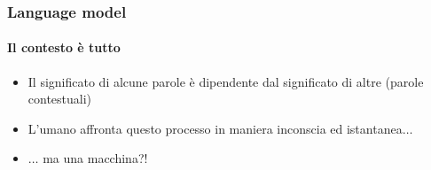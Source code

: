 \begin{frame}[t]
    \frametitle{Language model}
    \framesubtitle{Il contesto è tutto}
    {
        \begin{minipage}[t]{\textwidth}
    \end{minipage}
        \begin{minipage}[t]{\textwidth}
            \vspace*{.8cm}
            \begin{itemize}[leftmargin=10pt,align=right]
                \item[\alert{\faArrowCircleRight}] Il significato di alcune parole è dipendente dal significato di altre (\alert{parole contestuali})
                \item[\alert{\faArrowCircleRight}] L'umano affronta questo processo in maniera inconscia ed istantanea$\ldots$
                \item[\alert{\faArrowCircleRight}] $\ldots$ ma una macchina?!
            \end{itemize}
        \end{minipage}
    }
\end{frame}
%
